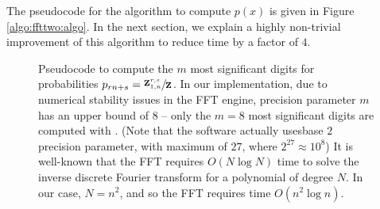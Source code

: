 The pseudocode for the algorithm to compute $p(x)$ is given in
Figure \ref{algo:ffttwo:algo}.
In the next section, we explain a highly non-trivial improvement of
this algorithm to reduce time by a factor of $4$.

\begin{figure}[!ht]
\caption{
Pseudocode to compute the $m$ most significant digits
for probabilities
$p_{rn+s} = \sfrac{{\bf Z}^{r,s}_{1,n}}{{\bf Z}^{}_{}}$. In our implementation,
due to numerical stability issues in the FFT engine, precision parameter
$m$ has an upper bound of $8$ -- only the $m=8$ most significant digits
are computed with \ffttwo.
(Note that the software actually usesbase $2$ precision parameter, with maximum of $27$, where $2^{27} \approx 10^8$)
It is well-known that
the FFT requires $O(N \log N)$ time to solve the inverse discrete
Fourier transform for a polynomial of degree $N$. In our case,
$N=n^2$, and so the FFT requires time $O(n^2 \log n)$.
}
\label{fig:ffttwo:pseudo}
\end{figure}

